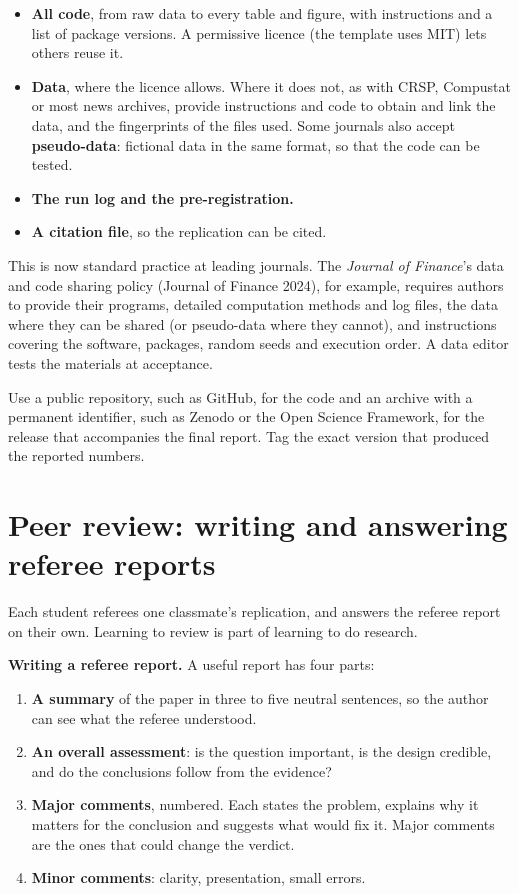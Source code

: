 \begin{itemize}
  \item \textbf{All code}, from raw data to every table and figure, with instructions and a list of package versions. A permissive licence (the template uses MIT) lets others reuse it.
  \item \textbf{Data}, where the licence allows. Where it does not, as with CRSP, Compustat or most news archives, provide instructions and code to obtain and link the data, and the fingerprints of the files used. Some journals also accept \textbf{pseudo-data}: fictional data in the same format, so that the code can be tested.
  \item \textbf{The run log and the pre-registration.}
  \item \textbf{A citation file}, so the replication can be cited.
\end{itemize}

This is now standard practice at leading journals. The \emph{Journal of Finance}'s data and code sharing policy (Journal of Finance 2024), for example, requires authors to provide their programs, detailed computation methods and log files, the data where they can be shared (or pseudo-data where they cannot), and instructions covering the software, packages, random seeds and execution order. A data editor tests the materials at acceptance.

Use a public repository, such as GitHub, for the code and an archive with a permanent identifier, such as Zenodo or the Open Science Framework, for the release that accompanies the final report. Tag the exact version that produced the reported numbers.

\section{Peer review: writing and answering referee reports}
\label{sec:26-review}

Each student referees one classmate's replication, and answers the referee report on their own. Learning to review is part of learning to do research.

\textbf{Writing a referee report.} A useful report has four parts:

\begin{enumerate}
  \item \textbf{A summary} of the paper in three to five neutral sentences, so the author can see what the referee understood.
  \item \textbf{An overall assessment}: is the question important, is the design credible, and do the conclusions follow from the evidence?
  \item \textbf{Major comments}, numbered. Each states the problem, explains why it matters for the conclusion and suggests what would fix it. Major comments are the ones that could change the verdict.
  \item \textbf{Minor comments}: clarity, presentation, small errors.
\end{enumerate}

